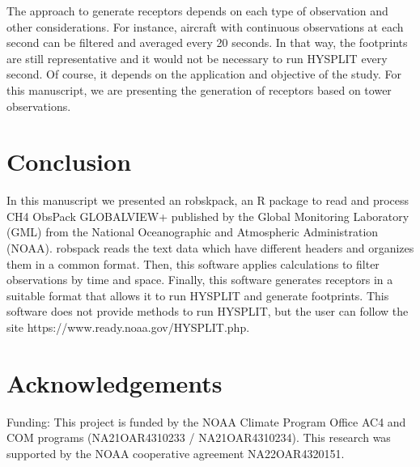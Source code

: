 \documentclass[preprint, 3p,
authoryear]{elsarticle} %
\begin{document}
The approach to generate receptors depends on each type of observation
and other considerations. For instance, aircraft with continuous
observations at each second can be filtered and averaged every 20
seconds. In that way, the footprints are still representative and it
would not be necessary to run HYSPLIT every second. Of course, it
depends on the application and objective of the study. For this
manuscript, we are presenting the generation of receptors based on tower
observations.

\hypertarget{conclusion}{%
\section{Conclusion}\label{conclusion}}

In this manuscript we presented an robskpack, an R package to read and
process CH4 ObsPack GLOBALVIEW+ published by the Global Monitoring
Laboratory (GML) from the National Oceanographic and Atmospheric
Administration (NOAA). robspack reads the text data which have different
headers and organizes them in a common format. Then, this software
applies calculations to filter observations by time and space. Finally,
this software generates receptors in a suitable format that allows it to
run HYSPLIT and generate footprints. This software does not provide
methods to run HYSPLIT, but the user can follow the site
https://www.ready.noaa.gov/HYSPLIT.php.

\hypertarget{acknowledgements}{%
\section{Acknowledgements}\label{acknowledgements}}

Funding: This project is funded by the NOAA Climate Program Office AC4
and COM programs (NA21OAR4310233 / NA21OAR4310234). This research was
supported by the NOAA cooperative agreement NA22OAR4320151.

\renewcommand\refname{References}

\end{document}
